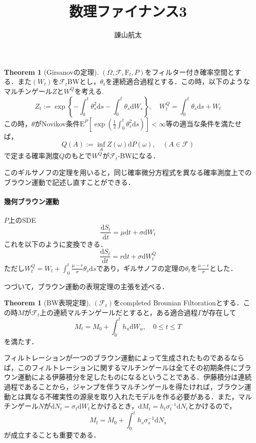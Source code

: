 \documentclass{jsarticle}
\title{数理ファイナンス3}
\author{諌山航太}
\theoremstyle{definition}
\newtheorem{thm}[dfn]{Theorem}
\begin{document}
\maketitle

\begin{thm}[Girsanovの定理]
$(\Omega, \mathscr{F}, \mathrm{F}_t, P)$をフィルター付き確率空間とする．また$(W_t)$を$\mathscr{F}_t$BWとし，$\theta_t$を連続適合過程とする．この時，以下のようなマルチンゲール$Z$と$W^Q$を考える.
\begin{equation*}
    Z_t := \exp{\left\{-\int_{0}^t \theta_s^2 \mathrm{d} s - \int_{0}^t\theta_s \mathrm{d}W_s\right\}}, \quad W^Q_t = \int_0^t \theta_s \mathrm{d}s + W_t
\end{equation*}
この時，$\theta$がNovikov条件$\mathrm{E}^P\left[\exp{(\frac{1}{2}\int_0^t\theta_s^2\mathrm{d}s)}\right] < \infty$等の適当な条件を満たせば，
\begin{equation*}
    Q(A) := \inf_A Z(\omega) \mathrm{d}P(\omega), \quad (A\in \mathscr{F})
\end{equation*}
で定まる確率測度$Q$のもとで$W^Q$が$\mathscr{F}_t$-BWになる．
\end{thm}

このギルサノフの定理を用いると，同じ確率微分方程式を異なる確率測度上でのブラウン運動で記述し直すことができる．
\paragraph{幾何ブラウン運動}
$P$上のSDE
\begin{equation*}
    \frac{\mathrm{d}S_t}{\mathrm{d}t} = \mu \mathrm{d}t + \sigma \mathrm{d} W_t
\end{equation*}
これを以下のように変換できる．
\begin{equation*}
    \frac{\mathrm{d}S_t}{\mathrm{d}t} = r \mathrm{d}t + \sigma \mathrm{d}W^Q_t
\end{equation*}
ただし$W_t^Q = W_t + \int_0^t \frac{\mu - r}{\sigma} \theta_s \mathrm{d}s$であり，ギルサノフの定理の$\theta_t$を$\frac{\mu - r}{\sigma}$とした．

つづいて，ブラウン運動の表現定理の主張を述べる．
\begin{thm}[BW表現定理]
    $(\mathscr{F}_t)$をcompleted Brounian Filtorationとする．この時$M$が$\mathscr{F}_t$上の連続マルチンゲールだとすると，ある適合過程$\Gamma$が存在して
    \begin{equation*}
        M_t = M_0 + \int_0^t h_u \mathrm{d}W_u, \quad 0 \leq t \leq T
    \end{equation*}
    を満たす．
\end{thm}
フィルトレーションが一つのブラウン運動によって生成されたものであるならば，このフィルトレーションに関するマルチンゲールは全てその初期条件にブラウン運動による伊藤積分を足したものになるということである．伊藤積分は連続過程であることから，ジャンプを伴うマルチンゲールを得たければ，ブラウン運動とは異なる不確実性の源泉を取り入れたモデルを作る必要がある．また，マルチンゲール$N$が$\mathrm{d}N_t = \sigma_t \mathrm{d}W_t$とかけるとき，$\mathrm{d}M_t = h_t \sigma_t^{-1} \mathrm{d}N_t$とかけるので，
\begin{equation*}
    M_t = M_0 + \int_0^t h_s \sigma_s^{-1} \mathrm{d}N_s
\end{equation*}
が成立することも重要である．
\end{document}

